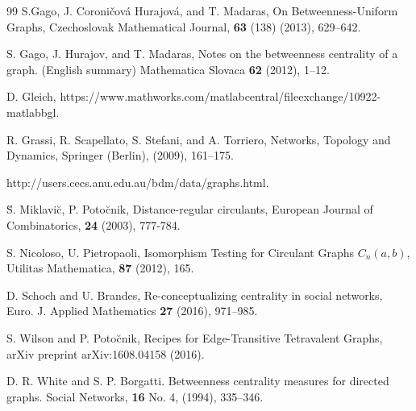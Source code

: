 \documentclass{article}%
\begin{document}
\begin{thebibliography}{99}
S.Gago, J. Coroni\v{c}ov\'{a} Hurajov\'{a}, and T. Madaras,
On Betweenness-Uniform Graphs, Czechoslovak Mathematical Journal, \textbf{63}
(138) (2013), 629--642.

S. Gago, J. Hurajov, and T. Madaras, Notes on the betweenness
centrality of a graph. (English summary) Mathematica Slovaca \textbf{62}
(2012), 1--12.

D. Gleich, https://www.mathworks.com/matlabcentral/fileexchange/10922-matlabbgl.

R. Grassi, R. Scapellato, S. Stefani, and A. Torriero,
Networks, Topology and Dynamics, Springer (Berlin), (2009), 161--175.

http://users.cecs.anu.edu.au/bdm/data/graphs.html.

\u{S}. Miklavi\u{c}, P. Poto\u{c}nik, Distance-regular
circulants, European Journal of Combinatorics, \textbf{24} (2003), 777-784.

S. Nicoloso, U. Pietropaoli, Isomorphism Testing for
Circulant Graphs $C_{n}(a,b)$, Utilitas Mathematica, \textbf{87} (2012), 165.

D. Schoch and U. Brandes, Re-conceptualizing centrality in
social networks, Euro. J. Applied Mathematics \textbf{27} (2016), 971--985.

S. Wilson and P. Poto\u{c}nik, Recipes for Edge-Transitive
Tetravalent Graphs, arXiv preprint arXiv:1608.04158 (2016).

D. R. White and S. P. Borgatti. Betweenness centrality
measures for directed graphs. Social Networks, \textbf{16} No. 4, (1994), 335--346.
\end{thebibliography}
\end{document}
